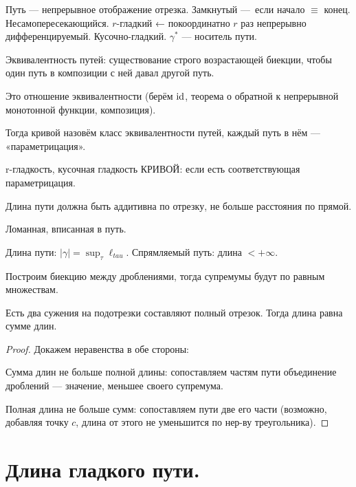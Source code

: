 \documentclass[12pt, a4paper]{article}
\begin{document}
    Путь — непрерывное отображение отрезка.
    Замкнутый — если начало $\equiv$ конец.
    Несамопересекающийся. 
    $r$-гладкий ← покоординатно $r$ раз непрерывно дифференцируемый.
    Кусочно-гладкий. $\gamma^*$ — носитель пути.

    Эквивалентность путей: существование строго возрастающей биекции, чтобы один путь 
    в композиции с ней давал другой путь.

    Это отношение эквивалентности (берём $\operatorname{id}$, теорема о обратной к непрерывной монотонной функции, композиция).

    Тогда кривой назовём класс эквивалентности путей, каждый путь в нём — «параметрицация».
    
    r-гладкость, кусочная гладкость КРИВОЙ: если есть соответствующая параметрицация.

    
    Длина пути должна быть аддитивна по отрезку, не больше расстояния по прямой.

    Ломанная, вписанная в путь.

    Длина пути: $|\gamma| = \sup_{\tau} \ell_{tau}$. Спрямляемый путь: длина $< +\infty$.

    \begin{theorem}

        Построим биекцию между дроблениями, тогда супремумы будут по равным множествам.
    \end{theorem}
    


    \begin{theorem}

        Есть два сужения на подотрезки составляют полный отрезок. Тогда длина равна сумме длин.

        \begin{proof}
            Докажем неравенства в обе стороны: 

            Сумма длин не больше полной длины: сопоставляем частям пути объединение дроблений — значение, меньшее своего супремума.

            Полная длина не больше сумм: 
            сопоставляем пути две его части 
            (возможно, добавляя точку $c$, длина от этого не уменьшится по нер-ву треугольника).
        \end{proof}
    \end{theorem}
    

\section{Длина гладкого пути.}
\end{document}
